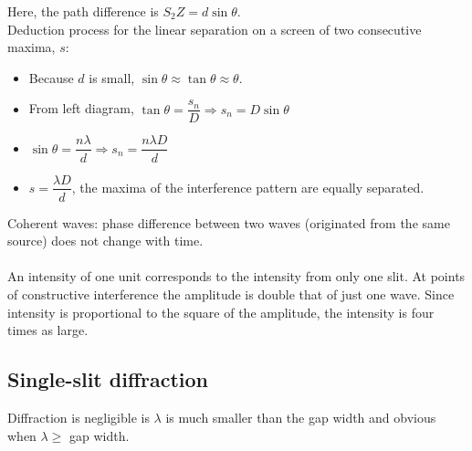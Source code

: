 Here, the path difference is $S_2Z=d\sin\theta$.\\
Deduction process for the linear separation on a screen of two consecutive maxima, $s$:
\begin{itemize}
  \item Because $d$ is small, $\sin\theta\approx\tan\theta\approx\theta$.
  \item From left diagram, $\tan\theta=\dfrac{s_n}{D}\Rightarrow s_n=D\sin\theta$
  \item $\sin\theta=\dfrac{n\lambda}{d}\Rightarrow s_n=\dfrac{n\lambda D}{d}$
  \item $s=\dfrac{\lambda D}{d}$, the maxima of the interference pattern are equally separated.
\end{itemize}
Coherent waves: phase difference between two waves (originated from the same source) does not change with time.\\\\
An intensity of one unit corresponds to the intensity from only one slit. At points of constructive interference the amplitude is double that of just one wave. Since intensity is proportional to the square of the amplitude, the intensity is four times as large.
\newpage
\subsection{Single-slit diffraction}
Diffraction is negligible is $\lambda$ is much smaller than the gap width and obvious when $\lambda\geq$ gap width.


